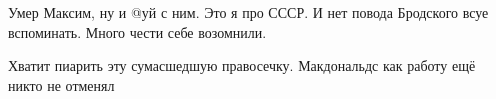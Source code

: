 \begin{itemize}
 
Умер Максим, ну и @уй с ним. Это я про СССР. И нет повода Бродского всуе вспоминать. Много чести себе возомнили.

 
Хватит пиарить эту сумасшедшую правосечку. Макдональдс как работу ещё никто не отменял

\end{itemize} %


